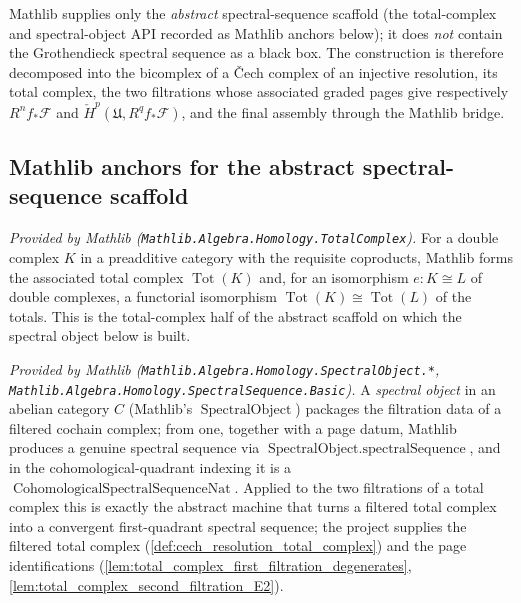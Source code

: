 Mathlib supplies only the \emph{abstract} spectral-sequence scaffold (the
total-complex and spectral-object API recorded as Mathlib anchors below); it does
\emph{not} contain the Grothendieck spectral sequence as a black box. The
construction is therefore decomposed into the bicomplex of a {\v C}ech complex of an
injective resolution, its total complex, the two filtrations whose associated graded
pages give respectively \(R^n f_*\mathcal{F}\) and
\(\check{H}^p(\mathfrak{U}, R^q f_*\mathcal{F})\), and the final assembly through the
Mathlib bridge.

\subsection{Mathlib anchors for the abstract spectral-sequence scaffold}

\begin{lemma}
  \label{lem:total_complex_mathlib}
  \mathlibok
  \textit{Provided by Mathlib (\texttt{Mathlib.Algebra.Homology.TotalComplex}).}
  For a double complex \(K\) in a preadditive category with the requisite coproducts,
  Mathlib forms the associated total complex \(\operatorname{Tot}(K)\) and, for an
  isomorphism \(e : K \cong L\) of double complexes, a functorial isomorphism
  \(\operatorname{Tot}(K) \cong \operatorname{Tot}(L)\) of the totals. This is the
  total-complex half of the abstract scaffold on which the spectral object below is
  built.
\end{lemma}

\begin{lemma}
  \label{lem:spectralObject_spectralSequence_mathlib}
  \mathlibok
  \textit{Provided by Mathlib (\texttt{Mathlib.Algebra.Homology.SpectralObject.*},
  \texttt{Mathlib.Algebra.Homology.SpectralSequence.Basic}).}
  A \emph{spectral object} in an abelian category \(C\) (Mathlib's
  \(\operatorname{SpectralObject}\)) packages the filtration data of a filtered
  cochain complex; from one, together with a page datum, Mathlib produces a genuine
  spectral sequence via \(\operatorname{SpectralObject.spectralSequence}\), and in the
  cohomological-quadrant indexing it is a
  \(\operatorname{CohomologicalSpectralSequenceNat}\). Applied to the two filtrations
  of a total complex this is exactly the abstract machine that turns a filtered total
  complex into a convergent first-quadrant spectral sequence; the project supplies the
  filtered total complex (\cref{def:cech_resolution_total_complex}) and the page
  identifications (\cref{lem:total_complex_first_filtration_degenerates},
  \cref{lem:total_complex_second_filtration_E2}).
\end{lemma}


